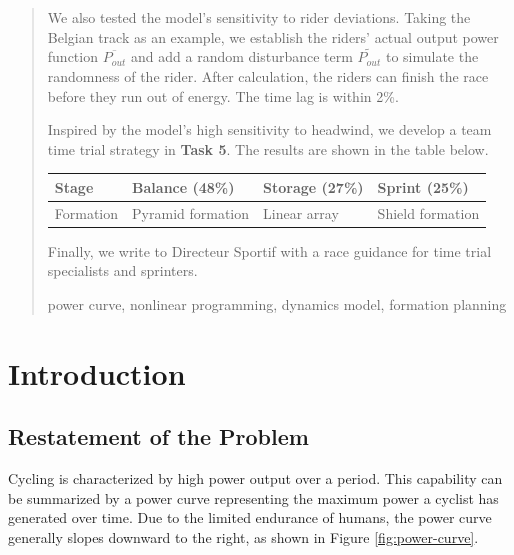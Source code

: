 \documentclass{mcmthesis}
\renewcommand{\contentsname}{\hspace*{\fill}\Large\bfseries Contents \hspace*{\fill}}
\begin{document}
\begin{abstract}
We also tested the model’s sensitivity to rider deviations. Taking the Belgian track as an example,
we establish the riders’ actual output power function $\overline{P_{out}}$ and add a random disturbance term $\widetilde{P_{out}}$ to
simulate the randomness of the rider. After calculation, the riders can finish the race before they run
out of energy. The time lag is within 2\%.

Inspired by the model’s high sensitivity to headwind, we develop a team time trial strategy in
\textbf{Task 5}. The results are shown in the table below.
\begin{table}[H]
  \centering
  \label{tab:stage-config}
  \begin{tabularx}{\textwidth}{lXXX}
    \toprule
    Stage & Balance (48\%) & Storage (27\%) & Sprint (25\%) \\
    \midrule
    Formation & Pyramid formation & Linear array & Shield formation \\
    \bottomrule
  \end{tabularx}
\end{table}
\vspace{-0.5cm}
Finally, we write to Directeur Sportif with a race guidance for time trial specialists and sprinters.
\begin{keywords}
 power curve, nonlinear programming, dynamics model, formation planning
\end{keywords}

\end{abstract}

\maketitle

\tableofcontents        %
\thispagestyle{fancy}

\newpage

\section{Introduction}

\subsection{Restatement of the Problem}

Cycling is characterized by high power output over a period. This capability can be summarized
by a power curve representing the maximum power a cyclist has generated over time. Due to the
limited endurance of humans, the power curve generally slopes downward to the right, as shown in Figure \ref{fig:power-curve}.
\end{document}
